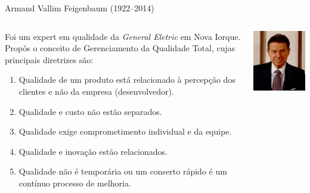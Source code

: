 \begin{frame}{Armand Vallim Feigenbaum (1922--2014)}
  \small
  \begin{columns}
    \begin{column}{.65\textwidth}
      Foi um expert em qualidade da \emph{General Eletric} em Nova
      Iorque. Propôs o conceito de Gerenciamento da Qualidade Total,
      cujas principais diretrizes são:
      \pause
      \begin{enumerate}[<+->]
      \item Qualidade de um produto está relacionado à percepção dos clientes e não da empresa (desenvolvedor).
      \item Qualidade e custo não estão separados.
      \item Qualidade exige comprometimento individual e da equipe.
      \item Qualidade e inovação estão relacionados.
      \item Qualidade não é temporária ou um conserto rápido é um contínuo processo de melhoria.
      \end{enumerate}
    \end{column}
    \begin{column}{.35\textwidth}
      \includegraphics[scale=.4]{img/feigenbaum.png}
    \end{column}
  \end{columns}
\end{frame}

